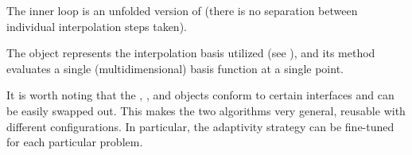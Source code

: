 \begin{compactlist}

 The inner loop is an unfolded version of 
(there is no separation between individual interpolation steps taken).

 The  object represents the interpolation basis
utilized (see ), and its  method evaluates a single
(multidimensional) basis function at a single point.

\end{compactlist}

It is worth noting that the , , and 
objects conform to certain interfaces and can be easily swapped out. This makes
the two algorithms very general, reusable with different configurations. In
particular, the adaptivity strategy can be fine-tuned for each particular
problem.
